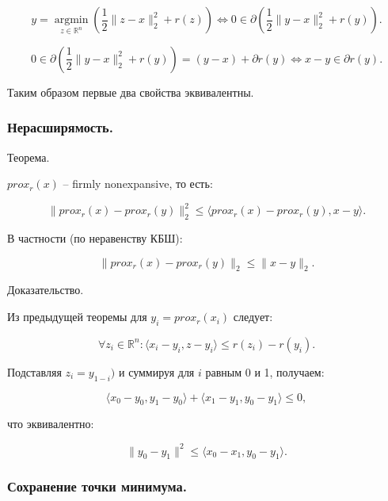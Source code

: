 \begin{equation}
    y=\mathop{argmin}\limits_{z\in\mathbb{R}^n}\left(\frac12\|z-x\|_2^2+r(z)\right)\iff
    0\in\partial\left(\frac12\|y-x\|_2^2+r(y)\right).
\end{equation}

\begin{equation}
    0\in\partial\left(\frac12\|y-x\|_2^2+r(y)\right)=
    (y-x)+\partial r(y)\iff x-y\in\partial r(y).
\end{equation}

Таким образом первые два свойства эквивалентны.

\subsubsection*{Нерасширямость.}

Теорема.

$prox_r(x)$ -- firmly nonexpansive, то есть:

\begin{equation}
    \|prox_r(x)-prox_r(y)\|_2^2\leq
    \langle prox_r(x)-prox_r(y),x-y\rangle.
\end{equation}

В частности (по неравенству КБШ):

\begin{equation}
    \|prox_r(x)-prox_r(y)\|_2\leq\|x-y\|_2.
\end{equation}

Доказательство.

Из предыдущей теоремы для $y_i=prox_r(x_i)$ следует:

\begin{equation}
    \forall z_i\in\mathbb{R}^n:
    \langle x_i-y_i,z-y_i\rangle\leq r(z_i)-r(y_i).
\end{equation}

Подставляя $z_i=y_{1-i})$ и суммируя для $i$ равным 0 и 1, получаем:

\begin{equation}
    \langle x_0-y_0,y_1-y_0\rangle+
    \langle x_1-y_1,y_0-y_1\rangle\leq0,
\end{equation}

что эквивалентно:

\begin{equation}
    \|y_0-y_1\|^2\leq\langle x_0-x_1,y_0-y_1\rangle.
\end{equation}

\subsubsection*{Сохранение точки минимума.}

